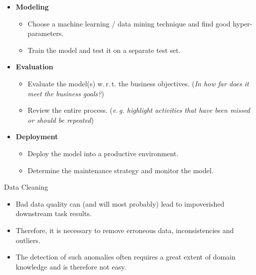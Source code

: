 \begin{frame}
	\begin{itemize}
		\item \textbf{Modeling}
		\begin{itemize}
			\item Choose a machine learning / data mining technique and find good hyper-parameters.
			\item Train the model and test it on a separate test set.
		\end{itemize}
		\item \textbf{Evaluation}
		\begin{itemize}
			\item Evaluate the model(s) w.\,r.\,t. the business objectives. (\textit{In how far does it meet the business goals?})
			\item Review the entire process. (\textit{e.\,g. highlight activities that have been missed or should be repeated})
		\end{itemize}
		\item \textbf{Deployment}
		\begin{itemize}
			\item Deploy the model into a productive environment.
			\item Determine the maintenance strategy and monitor the model.
		\end{itemize}
	\end{itemize}
\end{frame}



\begin{dwHeaderFrame}{Data Cleaning}
	\begin{itemize}
		\item Bad data quality can (and will most probably) lead to impoverished downstream task results.
		\item Therefore, it is necessary to remove erroneous data, inconsistencies and outliers.
		\item The detection of such anomalies often requires a great extent of domain knowledge and is therefore not easy.
	\end{itemize}
\end{dwHeaderFrame}


